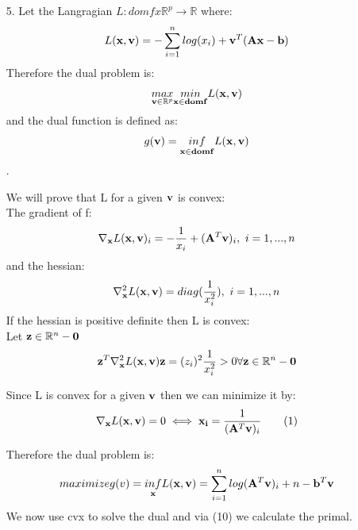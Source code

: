 \documentclass[12pt]{article}
\newcommand\numberthis{\addtocounter{equation}{1}\tag{\theequation}}
\begin{document}
\begin{enumerate}
		\item[5.]
		Let the Langragian $L:domfx\mathbb{R}^p\rightarrow \mathbb{R}$ where:
		\begin{align*}
			L({\bf x},{\bf v})=-\sum_{i=1}^{n}log(x_i)+{\bf v}^T({\bf A}{\bf x}-{\bf b})
		\end{align*}
		Therefore the dual problem is:
		\begin{align*}
			\underset{{\bf v}\in \mathbb{R}^p}{max}\underset{{\bf x\in domf}}{min}L({\bf x},{\bf v})
		\end{align*}
		and the dual function is defined as:
		\begin{align*}
			g({\bf v})=\underset{{\bf x\in domf}}{inf} L({\bf x},{\bf v})
		\end{align*}.
	
		We will prove that L for a given ${\bf v}$ is convex:\\
		The gradient of f:
		\begin{align*}
			\nabla_{\bf x} L({\bf x},{\bf v})_i=-\frac{1}{x_i}+({\bf A}^T{\bf v})_i,\ i=1,...,n
		\end{align*}
		and the hessian:
		\begin{align*}
			\nabla_{\bf x}^2 L({\bf x},{\bf v})=diag(\frac{1}{x^2_i}),\ i=1,...,n
		\end{align*}
		If the hessian is positive definite then L is convex:\\
		Let ${\bf z}\in\mathbb{R}^n-{\bf 0}$
		\begin{align*}
			{\bf z}^T\nabla_{\bf x}^2 L({\bf x},{\bf v}){\bf z}= (z_i)^2\frac{1}{x^2_i} >0 \forall {\bf z}\in\mathbb{R}^n-{\bf 0}
		\end{align*}
	
		Since L is convex for a given ${\bf v}$ then we can minimize it by:
		\begin{align*}
			\nabla_{\bf x}L({\bf x},{\bf v})=0 \iff {\bf x_i} = \frac{1}{({\bf A}^T{\bf v})_i}\numberthis
		\end{align*}
	
		Therefore the dual problem is:
		\begin{align*}
			maximize g(v)=\underset{{\bf x}}{inf}L({\bf x},{\bf v})=\sum_{i=1}^{n}log({\bf A}^T{\bf v})_i+n-{\bf b}^T{\bf v}
		\end{align*}
		We now use cvx to solve the dual and via (10) we calculate the primal.
		

\end{enumerate}
\end{document}
